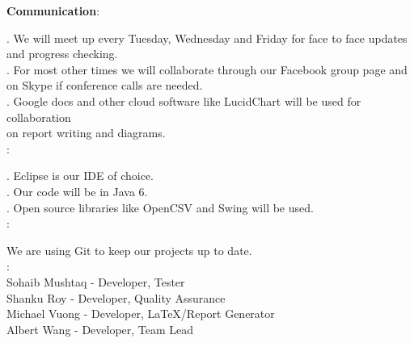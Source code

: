 \documentclass[a4paper]{article}
\begin{document}
{\bf Communication}: 

\indent{}.  We will meet up every Tuesday, Wednesday and Friday for face to face updates and progress checking. \\
\indent{}. For most other times we will collaborate through our Facebook group page and \\
on Skype if conference calls are needed. \\
\indent{}. Google docs and other cloud software like LucidChart will be used for collaboration \\
 on report writing and diagrams. \\

:

\indent{}. Eclipse is our IDE of choice. \\
\indent{}. Our code will be in Java 6. \\
\indent{}. Open source libraries like OpenCSV and Swing will be used. \\

:

We are using Git to keep our projects up to date. \\

: \\
\indent\indent Sohaib Mushtaq - Developer, Tester \\
\indent\indent Shanku Roy - Developer, Quality Assurance \\
\indent\indent Michael Vuong - Developer, LaTeX/Report Generator \\
\indent\indent Albert Wang -  Developer, Team Lead \\
\end{document}

